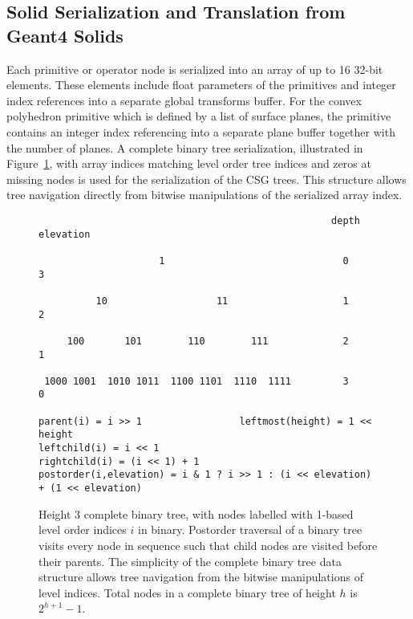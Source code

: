 \documentclass{webofc}
\begin{document}
\subsection{Solid Serialization and Translation from Geant4 Solids}
\label{translation}
%
Each primitive or operator node is serialized into an array of up to 16 32-bit elements. 
These elements include float parameters of the primitives and integer index references 
into a separate global transforms buffer. For the convex polyhedron primitive which is defined by a list of surface planes, 
the primitive contains an integer index referencing into a separate plane buffer together with the number of planes. 
A complete binary tree serialization, illustrated in Figure~\ref{tree},  with array indices matching level order tree indices
and zeros at missing nodes is used for the serialization of the CSG trees. This structure   
allows tree navigation directly from bitwise manipulations of the serialized array index. 
%
\begin{figure}[ht]
\begin{verbatim}
                                                   depth     elevation

                     1                               0           3   

          10                   11                    1           2   

     100       101        110        111             2           1   
                    
 1000 1001  1010 1011  1100 1101  1110  1111         3           0   

parent(i) = i >> 1                 leftmost(height) = 1 << height 
leftchild(i) = i << 1               
rightchild(i) = (i << 1) + 1  
postorder(i,elevation) = i & 1 ? i >> 1 : (i << elevation) + (1 << elevation) 
\end{verbatim}

\caption{Height 3 complete binary tree, with nodes labelled with 1-based level order indices $i$ in binary. Postorder traversal of a binary tree
visits every node in sequence such that child nodes are visited before their parents. The simplicity of the complete binary tree data structure allows tree navigation 
from the bitwise manipulations of level indices. Total nodes in a complete binary tree of height $h$ is $2^{h+1} - 1$.  }
\label{tree}
\end{figure}
\end{document}
